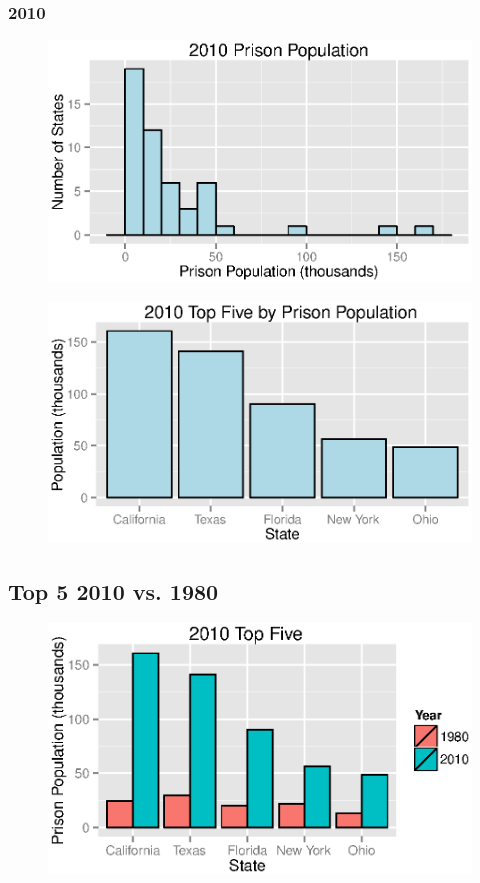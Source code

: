\documentclass{exam}
\begin{document}
  \subsubsection{2010}
  \begin{figure}[H]
    \centering
    \includegraphics[scale = 0.9]{2010_pp_histogram.eps}
  \end{figure}

  \begin{figure}[H]
    \centering
    \includegraphics[scale = 0.9]{top_five_2010.eps}
  \end{figure}

  \subsection{Top 5 2010 vs. 1980}
  \begin{figure}[H]
    \centering
    \includegraphics[scale = 0.9]{1980_to_2010_top_five.eps}
  \end{figure}
\end{document}
